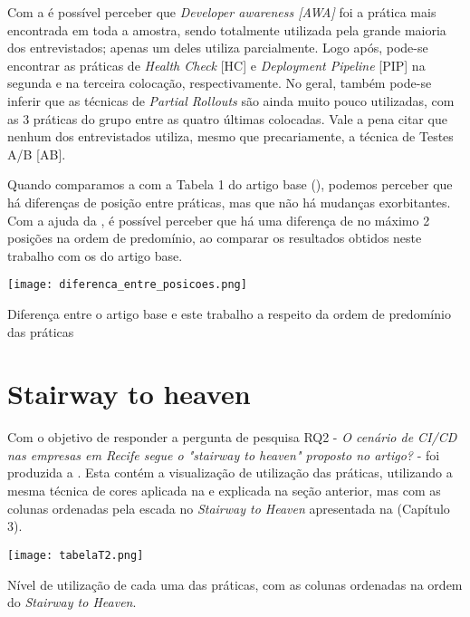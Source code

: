 Com a  é possível perceber que \emph{Developer awareness [AWA]} foi a prática mais encontrada em toda a amostra, sendo totalmente utilizada pela grande maioria dos entrevistados; apenas um deles utiliza parcialmente. Logo após, pode-se encontrar as práticas de \emph{Health Check} [HC] e \emph{Deployment Pipeline} [PIP] na segunda e na terceira colocação, respectivamente. No geral, também pode-se inferir que as técnicas de \emph{Partial Rollouts} são ainda muito pouco utilizadas, com as 3 práticas do grupo entre as quatro últimas colocadas. Vale a pena citar que nenhum dos entrevistados utiliza, mesmo que precariamente, a técnica de Testes A/B [AB].

Quando comparamos a  com a Tabela 1 do artigo base (), podemos perceber que há diferenças de posição entre práticas, mas que não há mudanças exorbitantes. Com a ajuda da , é possível perceber que há uma diferença de no máximo 2 posições na ordem de predomínio, ao comparar os resultados obtidos neste trabalho com os do artigo base. 

\begin{table}[ht]
\begin{center}
\texttt{[image: diferenca\_entre\_posicoes.png]}
\end{center}
\caption[Diferença entre a ordem de predomínio das práticas]{
    Diferença entre o artigo base e este trabalho a respeito da ordem de predomínio das práticas
}\label{diferenca_entre_posicoes_fig}
\end{table}

\section{Stairway to heaven}

Com o objetivo de responder a pergunta de pesquisa RQ2 - \emph{ O cenário de CI/CD nas empresas em Recife segue o "stairway to heaven" proposto no artigo?} - foi produzida a . Esta contém a visualização de utilização das práticas, utilizando a mesma técnica de cores aplicada na  e explicada na seção anterior, mas com as colunas ordenadas pela escada no \emph{Stairway to Heaven} apresentada na  (Capítulo 3).

\begin{table}[ht]
\begin{center}
\texttt{[image: tabelaT2.png]}
\end{center}
\caption[Nível de utilização das práticas, com as colunas na ordem do \emph{Stairway to Heaven}]{
    Nível de utilização de cada uma das práticas, com as colunas ordenadas na ordem do \emph{Stairway to Heaven}.
}\label{tabela_t2}
\end{table}


